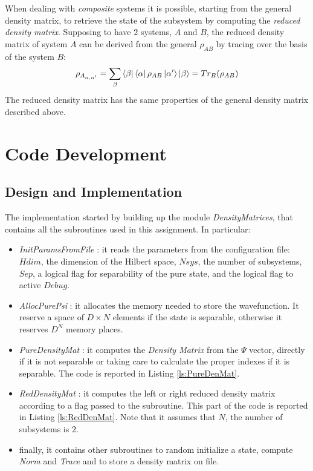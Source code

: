\documentclass[11pt,a4paper]{article}
\begin{document}
When dealing with \textit{composite} systems it is possible, starting from the general density matrix, to retrieve the state of the subsystem by computing the \textit{reduced density matrix}. 
Supposing to have $2$ systems, $A$ and $B$, the reduced density matrix of system $A$ can be derived from the general $\rho_{AB}$ by tracing over the basis of the system $B$:
\begin{equation}
 \rho_{A_{\alpha,\alpha'}} = \sum_{\beta} \bra{\beta} \bra{\alpha} \rho_{AB} \ket{\alpha'} \ket{\beta} = Tr_B(\rho_{AB})
 \label{eq:RedRho}
\end{equation}
The reduced density matrix has the same properties of the general density matrix described above.

\section{Code Development} %

\subsection{Design and Implementation}
The implementation started by building up the module \textit{DensityMatrices}, that contains all the subroutines used in this assignment. In particular:
\begin{itemize}
	\item \textit{InitParamsFromFile} : it reads the parameters from the configuration file: $Hdim$, the dimension of the Hilbert space, $Nsys$, the number of subsystems, $Sep$, a logical flag for separability of the pure state, and the logical flag to active $Debug$.
	\item \textit{AllocPurePsi} : it allocates the memory needed to store the wavefunction. It reserve a space of $D\times N$ elements if the state is separable, otherwise it reserves $D^N$ memory places.
	\item \textit{PureDensityMat} : it computes the \textit{Density Matrix} from the $\Psi$ vector, directly if it is not separable or taking care to calculate the proper indexes if it is separable. The code is reported in Listing \ref{ls:PureDenMat}.
	\item \textit{RedDensityMat} : it computes the left or right reduced density matrix according to a flag passed to the subroutine. This part of the code is reported in Listing \ref{ls:RedDenMat}. Note that it assumes that $N$, the number of subsystems is $2$.
	\item finally, it contains other subroutines to random initialize a state, compute \textit{Norm} and \textit{Trace} and to store a density matrix on file.
\end{itemize}
\end{document}
